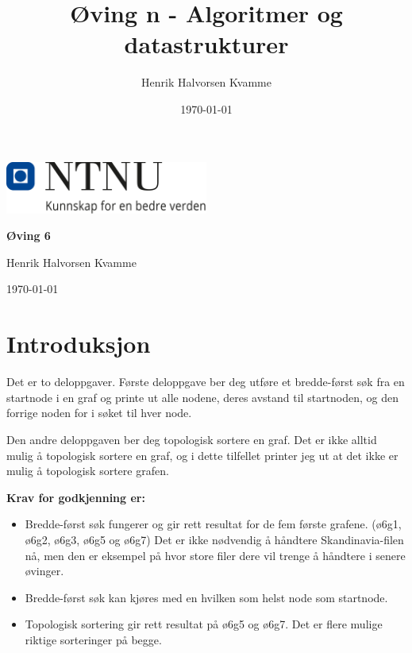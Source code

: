 \documentclass[12pt,a4paper]{article}
\title{Øving n - Algoritmer og datastrukturer}
\author{Henrik Halvorsen Kvamme}
\date{\today}
\begin{document}
\begin{center}
    \includegraphics[width=0.5\textwidth]{../images/NTNU_Logo.png}
    
    \vspace{1.5em}  %
    
    {\LARGE \textbf{Øving 6} \\[0.5em] }  %
    \vspace{1em}  %
    
    {\large Henrik Halvorsen Kvamme}\\  %
    \vspace{0.5em}  %
    
    {\today}  %
\end{center}

\vspace{2em}

\tableofcontents

\newpage

\section{Introduksjon}
Det er to deloppgaver. Første deloppgave ber deg utføre et bredde-først søk fra en startnode i en graf og printe ut alle nodene, deres avstand til startnoden, og den forrige noden for i søket til hver node.

Den andre deloppgaven ber deg topologisk sortere en graf. Det er ikke alltid mulig å topologisk sortere en graf, og i dette tilfellet printer jeg ut at det ikke er mulig å topologisk sortere grafen.

\textbf{Krav for godkjenning er:}
\begin{itemize}
    \item Bredde-først søk fungerer og gir rett resultat for de fem første grafene. (ø6g1, ø6g2, ø6g3, ø6g5 og ø6g7)
    Det er ikke nødvendig å håndtere Skandinavia-filen nå, men den er eksempel på hvor store filer dere vil trenge å håndtere i senere øvinger.
    \item Bredde-først søk kan kjøres med en hvilken som helst node som startnode.
    \item Topologisk sortering gir rett resultat på ø6g5 og ø6g7. Det er flere mulige riktige sorteringer på begge.
\end{itemize}
\end{document}
